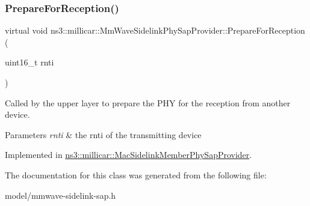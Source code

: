 \subsubsection{\texorpdfstring{Prepare\+For\+Reception()}{PrepareForReception()}}
{\footnotesize\ttfamily virtual void ns3\+::millicar\+::\+Mm\+Wave\+Sidelink\+Phy\+Sap\+Provider\+::\+Prepare\+For\+Reception (\begin{DoxyParamCaption}\item[{uint16\+\_\+t}]{rnti }\end{DoxyParamCaption})\hspace{0.3cm}{\ttfamily [pure virtual]}}



Called by the upper layer to prepare the P\+HY for the reception from another device. 


\begin{DoxyParams}{Parameters}
{\em rnti} & the rnti of the transmitting device \\
\hline
\end{DoxyParams}


Implemented in \hyperlink{classns3_1_1millicar_1_1MacSidelinkMemberPhySapProvider_afe0a87706052aabc88e7c4fbd4cc7a02}{ns3\+::millicar\+::\+Mac\+Sidelink\+Member\+Phy\+Sap\+Provider}.



The documentation for this class was generated from the following file\+:\begin{DoxyCompactItemize}
\item 
model/mmwave-\/sidelink-\/sap.\+h\end{DoxyCompactItemize}
